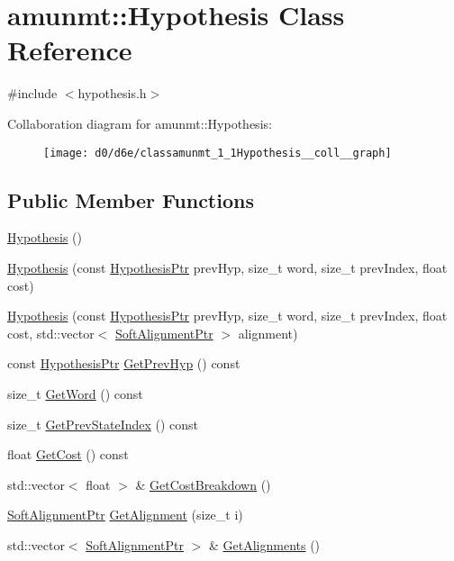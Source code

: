 \hypertarget{classamunmt_1_1Hypothesis}{}\section{amunmt\+:\+:Hypothesis Class Reference}
\label{classamunmt_1_1Hypothesis}


{\ttfamily \#include $<$hypothesis.\+h$>$}



Collaboration diagram for amunmt\+:\+:Hypothesis\+:
\nopagebreak
\begin{figure}[H]
\begin{center}
\leavevmode
\texttt{[image: d0/d6e/classamunmt\_1\_1Hypothesis\_\_coll\_\_graph]}
\end{center}
\end{figure}
\subsection*{Public Member Functions}
\begin{DoxyCompactItemize}
\item 
\hyperlink{classamunmt_1_1Hypothesis_a317ba0639cedb867b1914eed43996af9}{Hypothesis} ()
\item 
\hyperlink{classamunmt_1_1Hypothesis_acd7c9409c8e482416e858cd196481e9a}{Hypothesis} (const \hyperlink{namespaceamunmt_a9dd9d255e51649b0af19d0e895d52d2f}{Hypothesis\+Ptr} prev\+Hyp, size\+\_\+t word, size\+\_\+t prev\+Index, float cost)
\item 
\hyperlink{classamunmt_1_1Hypothesis_a0132565e3571b7d075a7d8f49163b164}{Hypothesis} (const \hyperlink{namespaceamunmt_a9dd9d255e51649b0af19d0e895d52d2f}{Hypothesis\+Ptr} prev\+Hyp, size\+\_\+t word, size\+\_\+t prev\+Index, float cost, std\+::vector$<$ \hyperlink{soft__alignment_8h_a875ec1de0fda25e65d972952540246ff}{Soft\+Alignment\+Ptr} $>$ alignment)
\item 
const \hyperlink{namespaceamunmt_a9dd9d255e51649b0af19d0e895d52d2f}{Hypothesis\+Ptr} \hyperlink{classamunmt_1_1Hypothesis_a8a4f3fb6e6dd5064f7717641fff48253}{Get\+Prev\+Hyp} () const 
\item 
size\+\_\+t \hyperlink{classamunmt_1_1Hypothesis_a6aee92eddaaf538f7bde3f1fce767a45}{Get\+Word} () const 
\item 
size\+\_\+t \hyperlink{classamunmt_1_1Hypothesis_aa7cbaf7f54edbe24a140893521c3a982}{Get\+Prev\+State\+Index} () const 
\item 
float \hyperlink{classamunmt_1_1Hypothesis_abc6eea3924489fe416a0ae4b1b1d90f1}{Get\+Cost} () const 
\item 
std\+::vector$<$ float $>$ \& \hyperlink{classamunmt_1_1Hypothesis_acf48ef334a8444930794a94ea067aa6a}{Get\+Cost\+Breakdown} ()
\item 
\hyperlink{soft__alignment_8h_a875ec1de0fda25e65d972952540246ff}{Soft\+Alignment\+Ptr} \hyperlink{classamunmt_1_1Hypothesis_a6d48e570a4e2010d9252aff05583e9c4}{Get\+Alignment} (size\+\_\+t i)
\item 
std\+::vector$<$ \hyperlink{soft__alignment_8h_a875ec1de0fda25e65d972952540246ff}{Soft\+Alignment\+Ptr} $>$ \& \hyperlink{classamunmt_1_1Hypothesis_a2b7fd0476f31bb7edf0c695609fb3096}{Get\+Alignments} ()
\end{DoxyCompactItemize}
